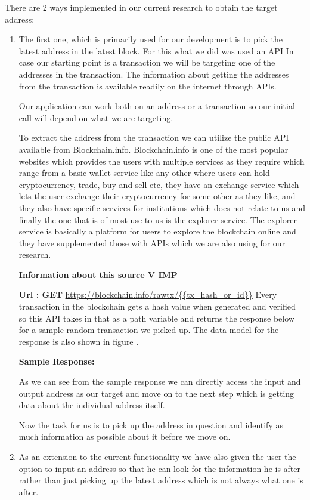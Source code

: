 \documentclass{article}
\begin{document}
        There are 2 ways implemented in our current research to obtain the target address: 
        \begin{enumerate}
            \item The first one, which is primarily used for our development is to pick the latest address in the latest block. 
            For this what we did was used an API 
            In case our starting point is a transaction we will be targeting one of the addresses in the transaction. The information about getting the addresses from the transaction is available readily on the internet through APIs.
        
        Our application can work both on an address or a transaction so our initial call will depend on what we are targeting. 
        
        To extract the address from the transaction we can utilize the public API available from Blockchain.info\cite{blockchain.com}. Blockchain.info is one of the most popular websites which provides the users with multiple services as they require which range from a basic wallet service like any other where users can hold cryptocurrency, trade, buy and sell etc, they have an exchange service which lets the user exchange their cryptocurrency for some other as they like, and they also have specific services for institutions which does not relate to us and finally the one that is of most use to us is the explorer service. The explorer service is basically a platform for users to explore the blockchain online and they have supplemented those with APIs which we are also using for our research. 
        
        \textbf{Information about this source V IMP}
        
        \textbf{Url : GET} \url{https://blockchain.info/rawtx/{{tx_hash_or_id}}}
        Every transaction in the blockchain gets a hash value when generated and verified so this API takes in that as a path variable and returns the response below for a sample random transaction we picked up. The data model for the response is also shown in figure \cite{Fig}.
        
        \textbf{Sample Response: }
        
        
        As we can see from the sample response we can directly access the input and output address as our target and move on to the next step which is getting data about the individual address itself.
        
        Now the task for us is to pick up the address in question and identify as much information as possible about it before we move on.
        
            \item As an extension to the current functionality we have also given the user the option to input an address so that he can look for the information he is after rather than just picking up the latest address which is not always what one is after. 
        
        \end{enumerate}
        
\end{document}
